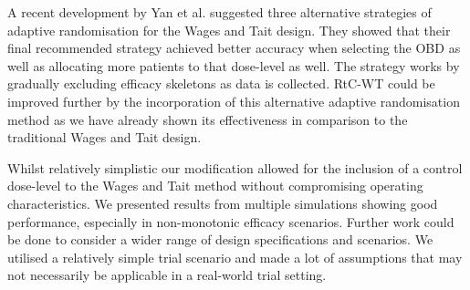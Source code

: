 A recent development by Yan et al. \cite{yanImprovedAdaptiveRandomization2019} suggested three alternative strategies of adaptive randomisation for the Wages and Tait design. They showed that their final recommended strategy achieved better accuracy when selecting the OBD as well as allocating more patients to that dose-level as well. The strategy works by gradually excluding efficacy skeletons as data is collected. RtC-WT could be improved further by the incorporation of this alternative adaptive randomisation method as we have already shown its effectiveness in comparison to the traditional Wages and Tait design.  

Whilst relatively simplistic our modification allowed for the inclusion of a control dose-level to the Wages and Tait method without compromising operating characteristics. We presented results from multiple simulations showing good performance, especially in non-monotonic efficacy scenarios. Further work could be done to consider a wider range of design specifications and scenarios. We utilised a relatively simple trial scenario and made a lot of assumptions that may not necessarily  be applicable in a real-world trial setting.  
